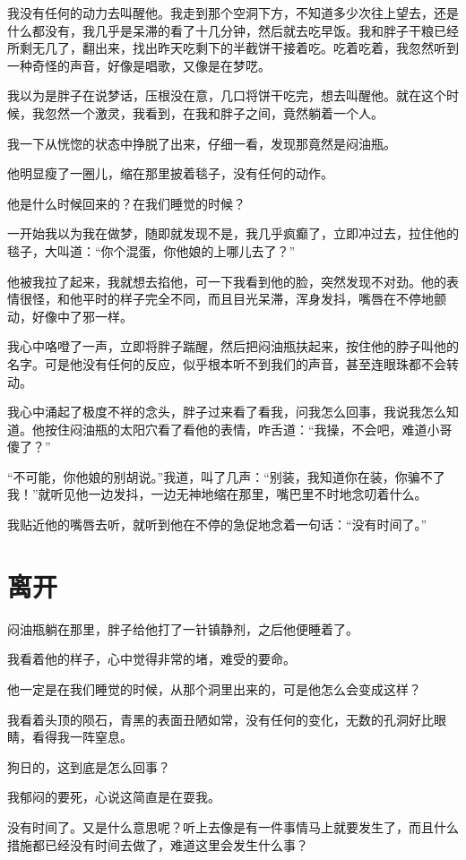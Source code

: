 我没有任何的动力去叫醒他。我走到那个空洞下方，不知道多少次往上望去，还是什么都没有，我几乎是呆滞的看了十几分钟，然后就去吃早饭。我和胖子干粮已经所剩无几了，翻出来，找出昨天吃剩下的半截饼干接着吃。吃着吃着，我忽然听到一种奇怪的声音，好像是唱歌，又像是在梦呓。

我以为是胖子在说梦话，压根没在意，几口将饼干吃完，想去叫醒他。就在这个时候，我忽然一个激灵，我看到，在我和胖子之间，竟然躺着一个人。

我一下从恍惚的状态中挣脱了出来，仔细一看，发现那竟然是闷油瓶。

他明显瘦了一圈儿，缩在那里披着毯子，没有任何的动作。

他是什么时候回来的？在我们睡觉的时候？

一开始我以为我在做梦，随即就发现不是，我几乎疯癫了，立即冲过去，拉住他的毯子，大叫道：“你个混蛋，你他娘的上哪儿去了？”

他被我拉了起来，我就想去掐他，可一下我看到他的脸，突然发现不对劲。他的表情很怪，和他平时的样子完全不同，而且目光呆滞，浑身发抖，嘴唇在不停地颤动，好像中了邪一样。

我心中咯噔了一声，立即将胖子踹醒，然后把闷油瓶扶起来，按住他的脖子叫他的名字。可是他没有任何的反应，似乎根本听不到我们的声音，甚至连眼珠都不会转动。

我心中涌起了极度不祥的念头，胖子过来看了看我，问我怎么回事，我说我怎么知道。他按住闷油瓶的太阳穴看了看他的表情，咋舌道：“我操，不会吧，难道小哥傻了？”

“不可能，你他娘的别胡说。”我道，叫了几声：“别装，我知道你在装，你骗不了我！”就听见他一边发抖，一边无神地缩在那里，嘴巴里不时地念叨着什么。

我贴近他的嘴唇去听，就听到他在不停的急促地念着一句话：“没有时间了。”

\chapter{离开}

闷油瓶躺在那里，胖子给他打了一针镇静剂，之后他便睡着了。

我看着他的样子，心中觉得非常的堵，难受的要命。

他一定是在我们睡觉的时候，从那个洞里出来的，可是他怎么会变成这样？

我看着头顶的陨石，青黑的表面丑陋如常，没有任何的变化，无数的孔洞好比眼睛，看得我一阵窒息。

狗日的，这到底是怎么回事？

我郁闷的要死，心说这简直是在耍我。

没有时间了。又是什么意思呢？听上去像是有一件事情马上就要发生了，而且什么措施都已经没有时间去做了，难道这里会发生什么事？

